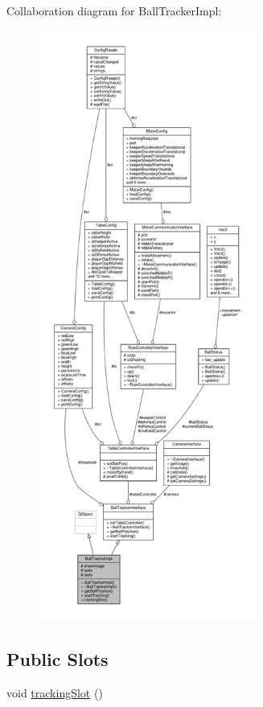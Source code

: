 Collaboration diagram for Ball\+Tracker\+Impl\+:\nopagebreak
\begin{figure}[H]
\begin{center}
\leavevmode
\includegraphics[height=550pt]{class_ball_tracker_impl__coll__graph}
\end{center}
\end{figure}
\subsection*{Public Slots}
\begin{DoxyCompactItemize}
\item 
void \hyperlink{class_ball_tracker_impl_a4a66db042c2b4a2f0c2f76c6c9fbfa96}{tracking\+Slot} ()
\end{DoxyCompactItemize}
